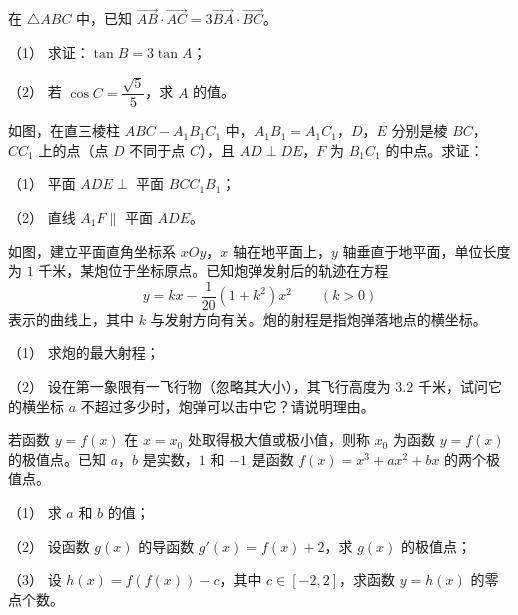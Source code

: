 \begin{question}
在 $\triangle ABC$ 中，已知 $\overrightarrow{AB}\cdot\overrightarrow{AC}=3\overrightarrow{BA}\cdot\overrightarrow{BC}$。

（1） 求证：$\tan B=3\tan A$；

（2） 若 $\cos C=\dfrac{\sqrt5}5$，求 $A$ 的值。

\Needspace{0.4\textheight}
\end{question}
\begin{question}
如图，在直三棱柱 $ABC-A_1B_1C_1$ 中，$A_1B_1=A_1C_1$，$D$，$E$ 分别是棱 $BC$，$CC_1$ 上的点（点 $D$ 不同于点 $C$），且 $AD\perp DE$，$F$ 为 $B_1C_1$ 的中点。求证：

（1） 平面 $ADE\perp$ 平面 $BCC_1B_1$；

（2） 直线 $A_1F\parallel$ 平面 $ADE$。
\nopagebreak[4]
\begin{center}\end{center}
\nopagebreak[4]
\Needspace{0.4\textheight}
\end{question}
\begin{question}
如图，建立平面直角坐标系 $xOy$，$x$ 轴在地平面上，$y$ 轴垂直于地平面，单位长度为 $1$ 千米，某炮位于坐标原点。已知炮弹发射后的轨迹在方程
\nopagebreak[4]
\[y=kx-\frac1{20}(1+k^2)x^2\qquad(k>0)\]
表示的曲线上，其中 $k$ 与发射方向有关。炮的射程是指炮弹落地点的横坐标。

（1） 求炮的最大射程；

（2） 设在第一象限有一飞行物（忽略其大小），其飞行高度为 $3.2$ 千米，试问它的横坐标 $a$ 不超过多少时，炮弹可以击中它？请说明理由。
\nopagebreak[4]
\begin{center}\end{center}
\nopagebreak[4]
\end{question}
\begin{question}
若函数 $y=f(x)$ 在 $x=x_0$ 处取得极大值或极小值，则称 $x_0$ 为函数 $y=f(x)$ 的极值点。已知 $a$，$b$ 是实数，$1$ 和 $-1$ 是函数 $f(x)=x^3+ax^2+bx$ 的两个极值点。

（1） 求 $a$ 和 $b$ 的值；

（2） 设函数 $g(x)$ 的导函数 $g'(x)=f(x)+2$，求 $g(x)$ 的极值点；

（3） 设 $h(x)=f(f(x))-c$，其中 $c\in[-2,2]$，求函数 $y=h(x)$ 的零点个数。

\Needspace{0.4\textheight}
\end{question}
